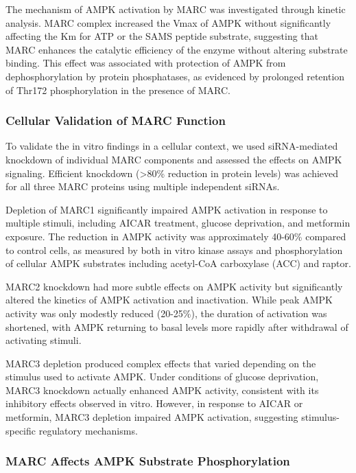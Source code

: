 \documentclass[11pt,a4paper]{article}
\begin{document}
The mechanism of AMPK activation by MARC was investigated through kinetic analysis. MARC complex increased the Vmax of AMPK without significantly affecting the Km for ATP or the SAMS peptide substrate, suggesting that MARC enhances the catalytic efficiency of the enzyme without altering substrate binding. This effect was associated with protection of AMPK from dephosphorylation by protein phosphatases, as evidenced by prolonged retention of Thr172 phosphorylation in the presence of MARC.

\subsubsection{Cellular Validation of MARC Function}

To validate the in vitro findings in a cellular context, we used siRNA-mediated knockdown of individual MARC components and assessed the effects on AMPK signaling. Efficient knockdown (>80\% reduction in protein levels) was achieved for all three MARC proteins using multiple independent siRNAs.

Depletion of MARC1 significantly impaired AMPK activation in response to multiple stimuli, including AICAR treatment, glucose deprivation, and metformin exposure. The reduction in AMPK activity was approximately 40-60\% compared to control cells, as measured by both in vitro kinase assays and phosphorylation of cellular AMPK substrates including acetyl-CoA carboxylase (ACC) and raptor.

MARC2 knockdown had more subtle effects on AMPK activity but significantly altered the kinetics of AMPK activation and inactivation. While peak AMPK activity was only modestly reduced (20-25\%), the duration of activation was shortened, with AMPK returning to basal levels more rapidly after withdrawal of activating stimuli.

MARC3 depletion produced complex effects that varied depending on the stimulus used to activate AMPK. Under conditions of glucose deprivation, MARC3 knockdown actually enhanced AMPK activity, consistent with its inhibitory effects observed in vitro. However, in response to AICAR or metformin, MARC3 depletion impaired AMPK activation, suggesting stimulus-specific regulatory mechanisms.

\subsubsection{MARC Affects AMPK Substrate Phosphorylation}
\end{document}
